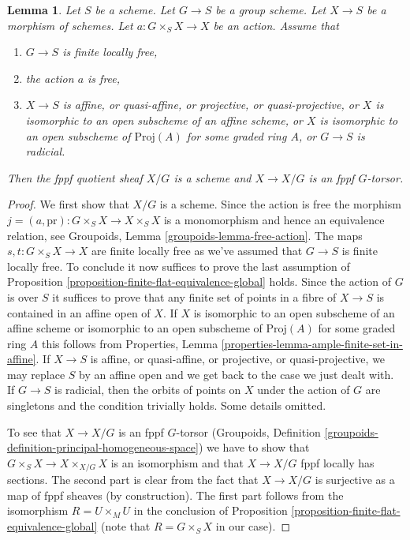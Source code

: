 \documentclass[10pt,a4paper]{amsart}
\theoremstyle{plain}
\newtheorem{lemma}[subsection]{Lemma}
\theoremstyle{definition}
\theoremstyle{remark}
\numberwithin{equation}{subsection}
\begin{document}
\begin{lemma}
\label{lemma-quotient-scheme}
Let $S$ be a scheme. Let $G \to S$ be a group scheme. Let $X \to S$ be
a morphism of schemes. Let $a : G \times_S X \to X$ be an action. Assume that
\begin{enumerate}
\item $G \to S$ is finite locally free,
\item the action $a$ is free,
\item $X \to S$ is affine, or quasi-affine, or projective, or
quasi-projective, or $X$ is isomorphic to an open subscheme of an
affine scheme, or $X$ is isomorphic to an open subscheme of $\text{Proj}(A)$
for some graded ring $A$, or $G \to S$ is radicial.
\end{enumerate}
Then the fppf quotient sheaf $X/G$ is a scheme and $X \to X/G$
is an fppf $G$-torsor.
\end{lemma}

\begin{proof}
We first show that $X/G$ is a scheme. Since the action is free the morphism
$j = (a, \text{pr}) : G \times_S X \to X \times_S X$
is a monomorphism and hence an equivalence relation, see
Groupoids, Lemma \ref{groupoids-lemma-free-action}. The maps
$s, t : G \times_S X \to X$
are finite locally free as we've assumed that $G \to S$ is finite locally
free. To conclude it now suffices to prove the last assumption of
Proposition \ref{proposition-finite-flat-equivalence-global} holds.
Since the action of $G$ is over $S$ it suffices to prove that
any finite set of points in a fibre of $X \to S$ is contained in an
affine open of $X$. If $X$ is isomorphic to an open subscheme of an
affine scheme or isomorphic to an open subscheme of $\text{Proj}(A)$
for some graded ring $A$ this follows from
Properties, Lemma \ref{properties-lemma-ample-finite-set-in-affine}.
If $X \to S$ is affine, or quasi-affine, or projective, or
quasi-projective, we may replace $S$ by an affine open and we
get back to the case we just dealt with. If $G \to S$ is radicial,
then the orbits of points on $X$ under the action of $G$ are singletons
and the condition trivially holds. Some details omitted.

\medskip\noindent
To see that $X \to X/G$ is an fppf $G$-torsor
(Groupoids, Definition \ref{groupoids-definition-principal-homogeneous-space})
we have to show that $G \times_S X \to X \times_{X/G} X$
is an isomorphism and that $X \to X/G$ fppf locally has sections.
The second part is clear from the fact that $X \to X/G$ is surjective
as a map of fppf sheaves (by construction). The first part follows from
the isomorphism $R = U \times_M U$ in the conclusion of
Proposition \ref{proposition-finite-flat-equivalence-global}
(note that $R = G \times_S X$ in our case).
\end{proof}
\end{document}
